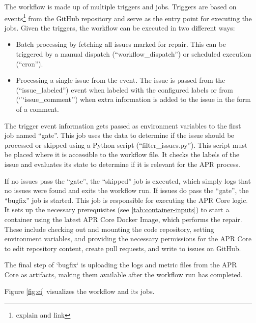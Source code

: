 The workflow is made up of multiple triggers and jobs. Triggers are based on events\footnote{explain and link} from the GitHub repository and serve as the entry point for executing the jobs. Given the triggers, the workflow can be executed in two different ways:

\begin{itemize}
    \item Batch processing by fetching all issues marked for repair. This can be triggered by a manual dispatch (``workflow\_dispatch'') or scheduled execution (``cron'').
    \item Processing a single issue from the event. The issue is passed from the (``issue\_labeled'') event when labeled with the configured labels or from (`'`issue\_comment'') when extra information is added to the issue in the form of a comment.
\end{itemize}

The trigger event information gets passed as environment variables to the first job named ``gate''. This job uses the data to determine if the issue should be processed or skipped using a Python script (``filter\_issues.py''). This script must be placed where it is accessible to the workflow file. It checks the labels of the issue and evaluates its state to determine if it is relevant for the APR process.

If no issues pass the ``gate'', the ``skipped'' job is executed, which simply logs that no issues were found and exits the workflow run. If issues do pass the ``gate'', the ``bugfix'' job is started. This job is responsible for executing the APR Core logic. It sets up the necessary prerequisites (see \ref{tab:container-inputs}) to start a container using the latest APR Core Docker Image, which performs the repair. These include checking out and mounting the code repository, setting environment variables, and providing the necessary permissions for the APR Core to edit repository content, create pull requests, and write to issues on GitHub.


The final step of `bugfix` is uploading the logs and metric files from the APR Core as artifacts, making them available after the workflow run has completed.

Figure \ref{fig:ci} visualizes the workflow and its jobs.

